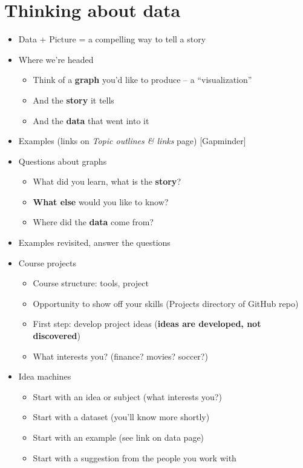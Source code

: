 \section*{Thinking about data}

\begin{itemize}

\item Data + Picture = a compelling way to tell a story

\item Where we're headed
\begin{itemize}
\item Think of a {\bf graph\/} you'd like to produce -- a ``visualization''
\item And the {\bf story\/} it tells
\item And the {\bf data\/} that went into it
\end{itemize}

\item Examples (links on {\it Topic outlines \& links\/} page) [Gapminder]

\item Questions about graphs
\begin{itemize}
\item What did you learn, what is the {\bf story\/}?
\item {\bf What else} would you like to know?
\item Where did the {\bf data\/} come from?
\end{itemize}

\item Examples revisited, answer the questions

\item Course projects
\begin{itemize}
\item Course structure:  tools, project
\item Opportunity to show off your skills (Projects directory of GitHub repo)
\item First step:  develop project ideas ({\bf ideas are developed, not discovered})
\item What interests {you}? (finance? movies?  soccer?)
\end{itemize}

\item Idea machines
\begin{itemize}
\item Start with an idea or subject (what interests you?)
\item Start with a dataset (you'll know more shortly)
\item Start with an example (see link on data page)
\item Start with a suggestion from the people you work with
\end{itemize}


\end{itemize}
